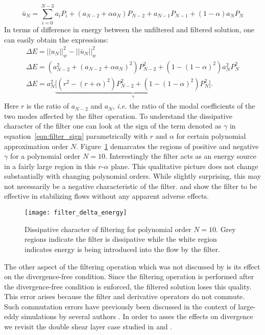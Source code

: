 \begin{equation}
	\bar{u}_{N} = \sum_{i=0}^{N-3}a_{i}P_{i} + (a_{N-2} + \alpha a_{N})P_{N-2} + a_{N-1}P_{N-1} + (1-\alpha)a_{N}P_{N}
\end{equation}
In terms of difference in energy between the unfiltered and filtered solution, one can easily obtain the expressions:
\begin{gather}
	\Delta E = ||u_{N}||_{w}^{2} - ||\bar{u}_{N}||_{w}^{2} \\
	\Delta E = (a_{N-2}^{2} + (a_{N-2} +\alpha a_{N})^{2})P_{N-2}^{2} + (1 - (1-\alpha)^{2})a_{N}^{2}P_{N}^{2} \nonumber\\
	\Delta E = a_{N}^2\underbrace{\big[(r^{2} - (r+ \alpha)^{2})P_{N-2}^{2} + (1 - (1-\alpha)^{2})P_{N}^{2}     \big]}_{\gamma}.
	\label{eqn:filter_sign}
\end{gather}
Here $r$ is the ratio of $a_{N-2}$ and $a_{N}$, \textit{i.e.} the ratio of the modal coefficients of the two modes affected by the filter operation. To understand the dissipative character of the filter one can look at the sign of the term denoted as $\gamma$ in equation~\ref{eqn:filter_sign} parametrically with $r$ and $\alpha$ for certain polynomial approximation order $N$. Figure~\ref{fig:filter_dissipation} demarcates the regions of positive and negative $\gamma$ for a polynomial order $N=10$. Interestingly the filter acts as an energy source in a fairly large region in this $r$-$\alpha$ plane. This qualitative picture does not change substantially with changing polynomial orders. While slightly surprising, this may not necessarily be a negative characteristic of the filter. \cite{fischer01} and \cite{malm13} show the filter to be effective in stabilizing flows without any apparent adverse effects.

\begin{figure}[h]
\centerline{\texttt{[image: filter\_delta\_energy]}}
\caption{\small{Dissipative character of filtering for polynomial order $N=10$. Grey regions indicate the filter is dissipative while the white region indicates energy is being introduced into the flow by the filter.}}
\label{fig:filter_dissipation}
\end{figure}

The other aspect of the filtering operation which was not discussed by \cite{fischer01} is its effect on the divergence-free condition. Since the filtering operation is performed after the divergence-free condition is enforced, the filtered solution loses this quality. This error arises because the filter and derivative operators do not commute. Such commutation errors have previously been discussed in the context of large-eddy simulations by several authors \citep{vanderbos05,geurts06,geurts97,domaradzki02,vasilyev98}. In order to asses the effects on divergence we revisit the double shear layer case studied in \cite{fischer01} and \cite{malm13}.

